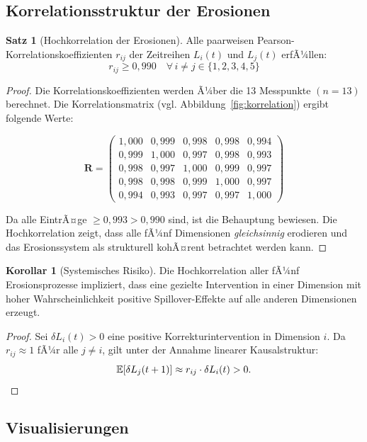 ﻿\documentclass[a4paper,12pt]{article}
\theoremstyle{definition}
\newtheorem{satz}{Satz}
\newtheorem{korollar}{Korollar}
\begin{document}
\subsection{Korrelationsstruktur der Erosionen}

\begin{satz}[Hochkorrelation der Erosionen]
\label{satz:korrelation}
Alle paarweisen Pearson-Korrelationskoeffizienten $r_{ij}$ der Zeitreihen $L_i(t)$ und $L_j(t)$ erfÃ¼llen:
\[
r_{ij} \geq 0{,}990 \quad \forall\, i \neq j \in \{1, 2, 3, 4, 5\}
\]
\end{satz}

\begin{proof}
Die Korrelationskoeffizienten werden Ã¼ber die 13 Messpunkte $(n = 13)$ berechnet. Die Korrelationsmatrix (vgl. Abbildung~\ref{fig:korrelation}) ergibt folgende Werte:

\[
\mathbf{R} = \begin{pmatrix}
1{,}000 & 0{,}999 & 0{,}998 & 0{,}998 & 0{,}994 \\
0{,}999 & 1{,}000 & 0{,}997 & 0{,}998 & 0{,}993 \\
0{,}998 & 0{,}997 & 1{,}000 & 0{,}999 & 0{,}997 \\
0{,}998 & 0{,}998 & 0{,}999 & 1{,}000 & 0{,}997 \\
0{,}994 & 0{,}993 & 0{,}997 & 0{,}997 & 1{,}000
\end{pmatrix}
\]

Da alle EintrÃ¤ge $\geq 0{,}993 > 0{,}990$ sind, ist die Behauptung bewiesen. Die Hochkorrelation zeigt, dass alle fÃ¼nf Dimensionen \emph{gleichsinnig} erodieren und das Erosionssystem als strukturell kohÃ¤rent betrachtet werden kann. \qedhere
\end{proof}

\begin{korollar}[Systemisches Risiko]
Die Hochkorrelation aller fÃ¼nf Erosionsprozesse impliziert, dass eine gezielte Intervention in einer Dimension mit hoher Wahrscheinlichkeit positive Spillover-Effekte auf alle anderen Dimensionen erzeugt.
\end{korollar}

\begin{proof}
Sei $\delta L_i(t) > 0$ eine positive Korrekturintervention in Dimension $i$. Da $r_{ij} \approx 1$ fÃ¼r alle $j \neq i$, gilt unter der Annahme linearer Kausalstruktur:
\[
\mathbb{E}[\delta L_j(t+1)] \approx r_{ij} \cdot \delta L_i(t) > 0. \qedhere
\]
\end{proof}

\subsection{Visualisierungen}
\end{document}
